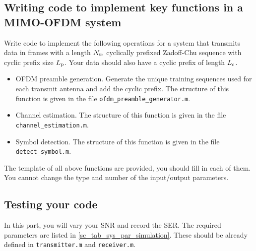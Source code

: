 \documentclass{book}
\begin{document}
\subsection{Writing code to implement key functions in a MIMO-OFDM system}
Write code to implement the following operations for a system that transmits data in frames with a length ${N_\mathrm{tr}}$ cyclically prefixed Zadoff-Chu sequence with cyclic prefix size ${L_\mathrm{p}}$. Your data should also have a cyclic prefix of length ${L_\mathrm{c}}$.
\begin{itemize}
\item OFDM preamble generation. Generate the unique training sequences used for each transmit antenna and add the cyclic prefix. The structure of this function is given in the file \verb|ofdm_preamble_generator.m|.
\item Channel estimation. The structure of this function is given in the file \verb|channel_estimation.m|.
\item Symbol detection. The structure of this function is given in the file \verb|detect_symbol.m|. 
\end{itemize}

The template of all above functions are provided, you should fill in each of them. You cannot change the type and number of the input/output parameters.


\subsection{Testing your code}

In this part, you will vary your SNR and record the SER. The required parameters are listed in \ref{sc_tab_sys_par_simulation}. These should be already defined in \verb|transmitter.m| and \verb|receiver.m|.
\end{document}
